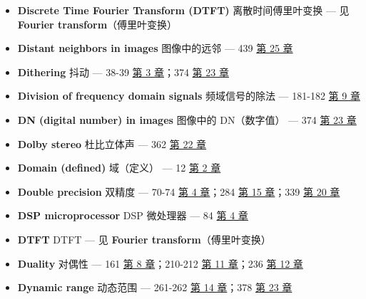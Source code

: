 \begin{itemize}
\begin{itemize}
{    章}；225-227  \hyperref[ch-12]{第 12 章}；519-521
     \hyperref[ch-28]{第 28 章}（疑为旧版页码，按内容应在
    567-569  \hyperref[ch-31]{第 31 章}）
  \item
    spectral density：谱密度 --- 156  \hyperref[ch-08]{第 8
    章}
  \item
    spectral leakage：频谱泄漏 --- 175-176 
    \hyperref[ch-09]{第 9 章}
  \item
    synthesis：合成 --- 152-156  \hyperref[ch-08]{第 8
    章}；573-580  \hyperref[ch-31]{第 31 章}
  \end{itemize}
\item
  \textbf{Discrete Time Fourier Transform (DTFT)} 离散时间傅里叶变换 ---
  见 \textbf{Fourier transform}（傅里叶变换）
\item
  \textbf{Distant neighbors in images} 图像中的远邻 --- 439 
  \hyperref[ch-25]{第 25 章}
\item
  \textbf{Dithering} 抖动 --- 38-39  \hyperref[ch-03]{第 3
  章}；374  \hyperref[ch-23]{第 23 章}
\item
  \textbf{Division of frequency domain signals} 频域信号的除法 ---
  181-182  \hyperref[ch-09]{第 9 章}
\item
  \textbf{DN (digital number) in images} 图像中的 DN（数字值） --- 374
   \hyperref[ch-23]{第 23 章}
\item
  \textbf{Dolby stereo} 杜比立体声 --- 362 
  \hyperref[ch-22]{第 22 章}
\item
  \textbf{Domain (defined)} 域（定义） --- 12 
  \hyperref[ch-02]{第 2 章}
\item
  \textbf{Double precision} 双精度 --- 70-74 
  \hyperref[ch-04]{第 4 章}；284  \hyperref[ch-15]{第 15
  章}；339  \hyperref[ch-20]{第 20 章}
\item
  \textbf{DSP microprocessor} DSP 微处理器 --- 84 
  \hyperref[ch-04]{第 4 章}
\item
  \textbf{DTFT} DTFT --- 见 \textbf{Fourier transform}（傅里叶变换）
\item
  \textbf{Duality} 对偶性 --- 161  \hyperref[ch-08]{第 8
  章}；210-212  \hyperref[ch-11]{第 11 章}；236 
  \hyperref[ch-12]{第 12 章}
\item
  \textbf{Dynamic range} 动态范围 --- 261-262 
  \hyperref[ch-14]{第 14 章}；378  \hyperref[ch-23]{第 23 章}
\end{itemize}


